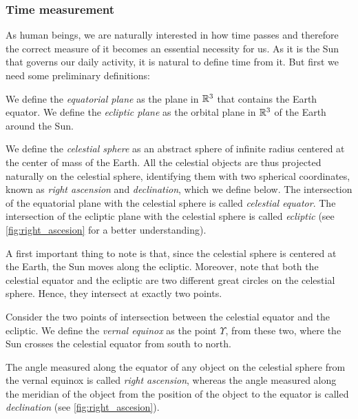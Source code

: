 \documentclass[../main.tex]{subfiles}
\begin{document}
\subsubsection{Time measurement}\label{sec:time_measurement}
As human beings, we are naturally interested in how time passes and therefore the correct measure of it becomes an essential necessity for us. As it is the Sun that governs our daily activity, it is natural to define time from it.
But first we need some preliminary definitions:
\begin{definition}
  We define the \emph{equatorial plane} as the plane in $\mathbb{R}^3$ that contains the Earth equator. We define the \emph{ecliptic plane} as the orbital plane in $\mathbb{R}^3$ of the Earth around the Sun.
\end{definition}
\begin{definition}
  We define the \emph{celestial sphere} as an abstract sphere of infinite radius centered at the center of mass of the Earth. All the celestial objects are thus projected naturally on the celestial sphere, identifying them with two spherical coordinates, known as \emph{right ascension} and \emph{declination}, which we define below. The intersection of the equatorial plane with the celestial sphere is called \emph{celestial equator}. The intersection of the ecliptic plane with the celestial sphere is called \emph{ecliptic} (see \cref{fig:right_ascesion} for a better understanding).
\end{definition}
A first important thing to note is that, since the celestial sphere is centered at the Earth, the Sun moves along the ecliptic. Moreover, note that both the celestial equator and the ecliptic are two different great circles on the celestial sphere. Hence, they intersect at exactly two points.

\begin{definition}
  Consider the two points of intersection between the celestial equator and the ecliptic. We define the \emph{vernal equinox} as the point $\Upsilon$, from these two, where the Sun crosses the celestial equator from south to north.
\end{definition}
The angle measured along the equator of any object on the celestial sphere from the vernal equinox is called \emph{right ascension}, whereas the angle measured along the meridian of the object from the position of the object to the equator is called \emph{declination} (see \cref{fig:right_ascesion}).
\end{document}

